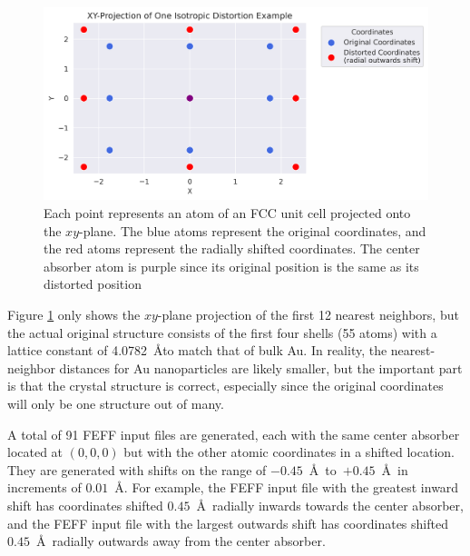 \begin{figure}[h]
	\centering
	\includegraphics[width=\linewidth]{Chapters/Figures/2d_distortion_example.png}
	\caption[2D Distortion]{Each point represents an atom of an FCC unit cell projected onto the $xy$\nobreakdash-plane. The blue atoms represent the original coordinates, and the red atoms represent the radially shifted coordinates. The center absorber atom is purple since its original position is the same as its distorted position}
	\label{fig:2d-distortion}
\end{figure}

Figure \ref{fig:2d-distortion} only shows the $xy$\nobreakdash-plane projection of the first 12 nearest neighbors, but the actual original structure consists of the first four shells (55 atoms) with a lattice constant of 
4.0782~\AA to match that of bulk Au. In reality, the nearest-neighbor distances for Au nanoparticles are likely smaller,  but the important part is that the crystal structure is correct, especially since the original coordinates will only be one structure out of many.

A total of 91 FEFF input files are generated, each with the same center absorber located at $ (0,0,0) $ but with the other atomic coordinates in a shifted location. They are generated with shifts on the range of $ -0.45 $~\AA~to~$ +0.45 $~\AA~in increments of $ 0.01 $~\AA. For example, the FEFF input file with the greatest inward shift has coordinates shifted $ 0.45 $~\AA~radially inwards towards the center absorber, and the FEFF input file with the largest outwards shift has coordinates shifted $ 0.45 $~\AA~radially outwards away from the center absorber.

